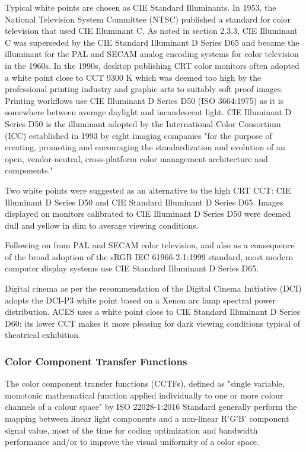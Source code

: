 Typical white points are chosen as CIE Standard Illuminants. In 1953, the National Television System Committee (NTSC) published a standard for color television that used CIE Illuminant C. As noted in section 2.3.3, CIE Illuminant C was superseded by the CIE Standard Illuminant D Series D65 and became the illuminant for the PAL and SECAM analog encoding systems for color television in the 1960s.
In the 1990s, desktop publishing CRT color monitors often adopted a white point close to CCT 9300 K which was deemed too high by the professional printing industry and graphic arts to suitably soft proof images. Printing workflows use CIE Illuminant D Series D50 (ISO 3664:1975) as it is somewhere between average daylight and incandescent light. CIE Illuminant D Series D50 is the illuminant adopted by the International Color Consortium (ICC) established in 1993 by eight imaging companies "for the purpose of creating, promoting and encouraging the standardization and evolution of an open, vendor-neutral, cross-platform color management architecture and components."

Two white points were suggested as an alternative to the high CRT CCT: CIE Illuminant D Series D50 and CIE Standard Illuminant D Series D65. Images displayed on monitors calibrated to CIE Illuminant D Series D50 were deemed dull and yellow in dim to average viewing conditions.

Following on from PAL and SECAM color television, and also as a consequence of the broad adoption of the sRGB IEC 61966-2-1:1999 standard, most modern computer display systems use CIE Standard Illuminant D Series D65.

Digital cinema as per the recommendation of the Digital Cinema Initiative (DCI) adopts the DCI-P3 white point based on a Xenon arc lamp spectral power distribution. ACES uses a white point close to CIE Standard Illuminant D Series D60: its lower CCT makes it more pleasing for dark viewing conditions typical of theatrical exhibition.

\subsubsection{Color Component Transfer Functions}%
\label{subsubsec:color-component-transfer-functions}
The color component transfer functions (CCTFs), defined as "single variable, monotonic mathematical function applied individually to one or more colour channels of a colour space" by  ISO 22028-1:2016 Standard generally perform the mapping between linear light components and a non-linear R'G'B' component signal value, most of the time for coding optimization and bandwidth performance and/or to improve the visual uniformity of a color space.

